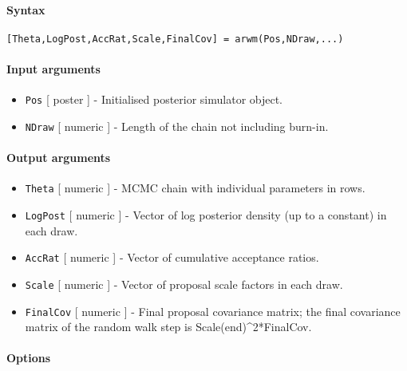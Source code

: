 


	\paragraph{Syntax}

\begin{verbatim}
[Theta,LogPost,AccRat,Scale,FinalCov] = arwm(Pos,NDraw,...)
\end{verbatim}

\paragraph{Input arguments}

\begin{itemize}
\item
  \texttt{Pos} {[} poster {]} - Initialised posterior simulator object.
\item
  \texttt{NDraw} {[} numeric {]} - Length of the chain not including
  burn-in.
\end{itemize}

\paragraph{Output arguments}

\begin{itemize}
\item
  \texttt{Theta} {[} numeric {]} - MCMC chain with individual parameters
  in rows.
\item
  \texttt{LogPost} {[} numeric {]} - Vector of log posterior density (up
  to a constant) in each draw.
\item
  \texttt{AccRat} {[} numeric {]} - Vector of cumulative acceptance
  ratios.
\item
  \texttt{Scale} {[} numeric {]} - Vector of proposal scale factors in
  each draw.
\item
  \texttt{FinalCov} {[} numeric {]} - Final proposal covariance matrix;
  the final covariance matrix of the random walk step is
  Scale(end)\^{}2*FinalCov.
\end{itemize}

\paragraph{Options}

